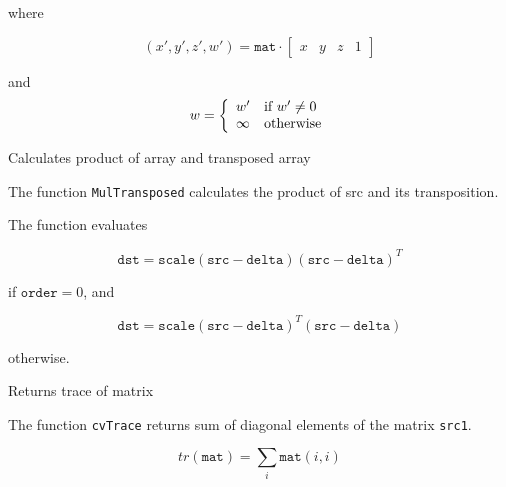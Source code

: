 where

\[
(x', y', z', w') = \texttt{mat} \cdot
\begin{bmatrix} x & y & z & 1 \end{bmatrix}
\]

and
\[ w = \left\{ \begin{array}{l l} w' & \mbox{if $w' \ne 0$}\\ \infty & \mbox{otherwise}\\ \end{array} \right. \]

\label{MulTransposed}

Calculates product of array and transposed array


\begin{description}
\end{description}

The function \texttt{MulTransposed} calculates the product of src and its transposition.

The function evaluates

\[
\texttt{dst}=\texttt{scale} (\texttt{src}-\texttt{delta}) (\texttt{src}-\texttt{delta})^T
\]

if $\texttt{order}=0$, and

\[
\texttt{dst}=\texttt{scale} (\texttt{src}-\texttt{delta})^T (\texttt{src}-\texttt{delta})
\]

otherwise.

\label{Trace}

Returns trace of matrix


\begin{description}
\end{description}


The function \texttt{cvTrace} returns sum of diagonal elements of the matrix \texttt{src1}.

\[ tr(\texttt{mat}) = \sum_i \texttt{mat}(i,i) \]

\label{Transpose}

